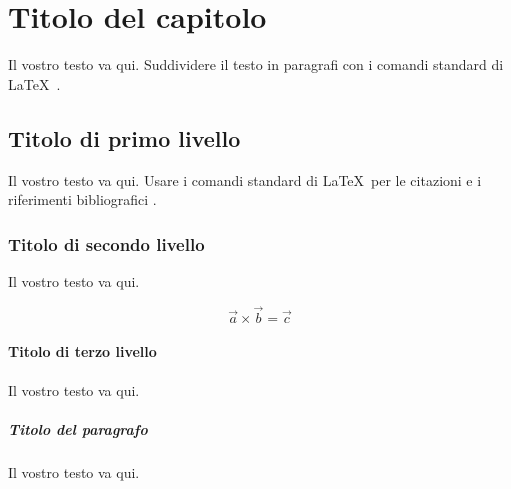 %
%
%

\chapter{Titolo del capitolo}
\label{intro} %

Il vostro testo va qui.  Suddividere il testo in paragrafi  con i comandi 
 standard di \LaTeX\ .

\section{Titolo di primo livello}
\label{sec:1}
Il vostro testo va qui. Usare  i comandi standard di  \LaTeX\ per le citazioni e i riferimenti bibliografici
\cite{monograph}.

\subsection{Titolo di secondo livello}
\label{sec:2}
Il vostro testo va qui.

\begin{equation}
\vec{a}\times\vec{b}=\vec{c}
\end{equation}

\subsubsection{Titolo di terzo livello}
Il vostro testo va qui. %

\paragraph{Titolo del paragrafo} %
Il vostro testo va qui.

